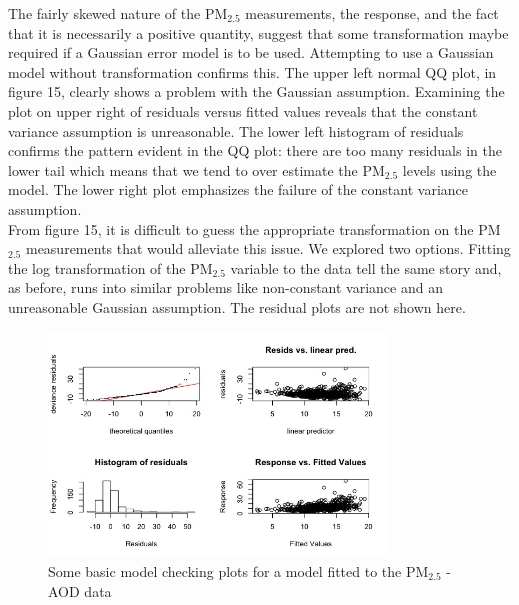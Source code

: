 \documentclass[10pt]{article}
\begin{document}
The fairly skewed nature of the PM$_{2.5}$ measurements, the response, and the fact that it is necessarily a positive quantity, suggest that some transformation maybe required if a Gaussian error model is to be used. Attempting to use a Gaussian model without transformation confirms this. The upper left normal QQ plot, in figure 15, clearly shows a problem with the Gaussian assumption. Examining the plot on upper right of residuals versus fitted values reveals that the constant variance assumption is unreasonable. The lower left histogram of residuals confirms the pattern evident in the QQ plot: there are too many residuals in the lower tail which means that we tend to over estimate the PM$_{2.5}$ levels using the model. The lower right plot emphasizes the failure of the constant variance assumption. \\ From figure 15, it is difficult to guess the appropriate transformation on the PM$_{2.5}$ measurements that would alleviate this issue. We explored two options. Fitting the log transformation of the PM$_{2.5}$ variable to the data tell the same story and, as before, runs into similar problems like non-constant variance and an unreasonable Gaussian assumption. The residual plots are not shown here.

\begin{figure}[H]
\centering
\includegraphics[width=0.8\textwidth]{gauss_diag.jpeg} 
\caption{Some basic model checking plots for a model fitted to the PM$_{2.5}$ - AOD data} 
\end{figure}
\end{document}
